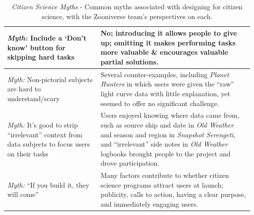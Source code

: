 \documentclass{sigchi}
\begin{document}
\begin{table}
\begin{center}
\begin{tabular}{p{4.5cm}p{13cm}}
\hline
\emph{Myth:} Include a `Don't know' button for skipping hard tasks &  No; introducing it allows people to give up; omitting it makes performing tasks more valuable \& encourages valuable partial solutions. \\
\hline
\emph{Myth:} Non-pictorial subjects are hard to understand/scary &  Several counter-examples, including \emph{Planet Hunters} in which users were given the ``raw'' light curve data with little explanation, yet seemed to offer no significant challenge. \\
\hline
\emph{Myth:} It's good to strip ``irrelevant'' context from data subjects to focus users on their tasks & Users enjoyed knowing where data came from, such as source ship and date in \emph{Old Weather} and season and region in \emph{Snapshot Serengeti}, and ``irrelevant'' side notes in \emph{Old Weather} logbooks brought people to the project and drove participation. \\
\hline
\emph{Myth:} ``If you build it, they will come'' &  Many factors contribute to whether citizen science programs attract users at launch; publicity, calls to action, having a clear purpose, and immediately engaging users. \\
\hline
\end{tabular}
\caption{\emph{Citizen Science Myths} - Common myths associated with designing for citizen science, with the Zooniverse team's perspectives on each.}
\label{tbl:myths}
\normalsize
\end{center}
\end{table}


\end{document}
